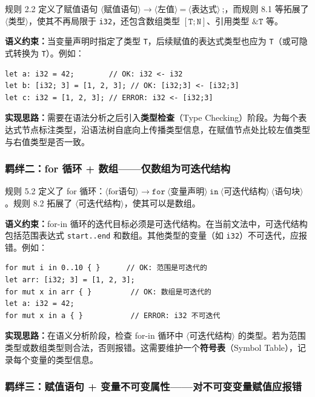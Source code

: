 \documentclass[12pt,a4paper]{ctexart}
\begin{document}
规则 2.2 定义了赋值语句 $\langle\text{赋值语句}\rangle \rightarrow \langle\text{左值}\rangle \ \texttt{=} \ \langle\text{表达式}\rangle \ \texttt{;}$，而规则 8.1 等拓展了 $\langle\text{类型}\rangle$，使其不再局限于 \texttt{i32}，还包含数组类型 $[\texttt{T}; \texttt{N}]$、引用类型 $\texttt{\&T}$ 等。

\textbf{语义约束：}当变量声明时指定了类型 \texttt{T}，后续赋值的表达式类型也应为 \texttt{T}（或可隐式转换为 \texttt{T}）。例如：

\begin{lstlisting}[language=RustLike]
let a: i32 = 42;        // OK: i32 <- i32
let b: [i32; 3] = [1, 2, 3]; // OK: [i32;3] <- [i32;3]
let c: i32 = [1, 2, 3]; // ERROR: i32 <- [i32;3]
\end{lstlisting}

\textbf{实现思路：}需要在语法分析之后引入\textbf{类型检查}（Type Checking）阶段。为每个表达式节点标注类型，沿语法树自底向上传播类型信息，在赋值节点处比较左值类型与右值类型是否一致。

\subsubsection{羁绊二：for 循环 + 数组——仅数组为可迭代结构}

规则 5.2 定义了 for 循环：$\langle\text{for语句}\rangle \rightarrow \texttt{for} \ \langle\text{变量声明}\rangle \ \texttt{in} \ \langle\text{可迭代结构}\rangle \ \langle\text{语句块}\rangle$。规则 8.2 拓展了 $\langle\text{可迭代结构}\rangle$，使其可以是数组。

\textbf{语义约束：}for-in 循环的迭代目标必须是可迭代结构。在当前文法中，可迭代结构包括范围表达式 \texttt{start..end} 和数组。其他类型的变量（如 \texttt{i32}）不可迭代，应报错。例如：

\begin{lstlisting}[language=RustLike]
for mut i in 0..10 { }      // OK: 范围是可迭代的
let arr: [i32; 3] = [1, 2, 3];
for mut x in arr { }         // OK: 数组是可迭代的
let a: i32 = 42;
for mut x in a { }           // ERROR: i32 不可迭代
\end{lstlisting}

\textbf{实现思路：}在语义分析阶段，检查 for-in 循环中 $\langle\text{可迭代结构}\rangle$ 的类型。若为范围类型或数组类型则合法，否则报错。这需要维护一个\textbf{符号表}（Symbol Table），记录每个变量的类型信息。

\subsubsection{羁绊三：赋值语句 + 变量不可变属性——对不可变变量赋值应报错}
\end{document}
